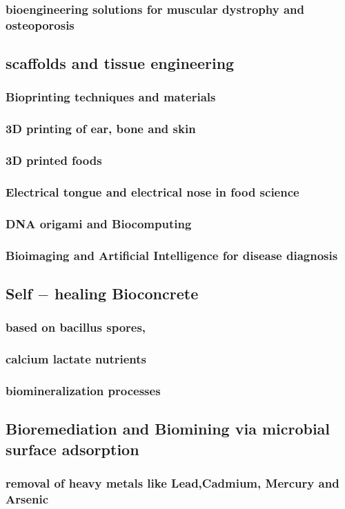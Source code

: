 \documentclass{article}
\begin{document}
	\subsubsection{bioengineering solutions for muscular dystrophy and osteoporosis}

	\subsection{scaffolds and tissue engineering}
	\subsubsection{Bioprinting techniques and materials}
	\subsubsection{3D printing of ear, bone and skin}
	\subsubsection{3D printed foods}
	\subsubsection{Electrical tongue and electrical nose in food science}
	\subsubsection{DNA origami and Biocomputing}
	\subsubsection{Bioimaging and Artificial Intelligence for disease diagnosis}

	\subsection{Self $-$ healing Bioconcrete}
	\subsubsection{based on bacillus spores,}
	\subsubsection{calcium lactate nutrients}
	\subsubsection{biomineralization processes}

	\subsection{Bioremediation and Biomining via microbial surface adsorption}
	\subsubsection{removal of heavy metals like Lead,Cadmium, Mercury and Arsenic}
\end{document}

